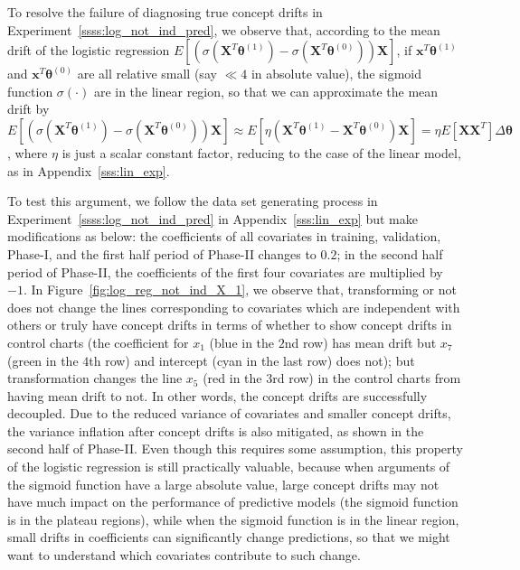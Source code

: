 \documentclass[twoside,11pt]{article}
\begin{document}
\begin{appendix}
\begin{enumerate}[(I)]
To resolve the failure of diagnosing true concept drifts in Experiment~\ref{ssss:log_not_ind_pred}, we observe that, according to the mean drift of the logistic regression $E [ (\sigma (\bm {X}^T\bm { \theta}^{ (1)}) - \sigma ( \bm {X}^T\bm { \theta}^{ (0)})) \bm {X}] $, if $ \bm {x}^T\bm { \theta}^{ (1)}$ and $ \bm {x}^T\bm { \theta}^{ (0)}$ are all relative small (say $\ll 4$ in absolute value), the sigmoid function $ \sigma (\cdot)$ are in the linear region, so that we can approximate the mean drift by $E [ (\sigma ( \bm {X}^T\bm { \theta}^{ (1)} ) - \sigma ( \bm {X}^T\bm { \theta}^{ (0)} )) \bm {X}] \approx E [ \eta( \bm {X}^T\bm { \theta}^{ (1)} -  \bm {X}^T\bm { \theta}^{ (0)} ) \bm {X}] = \eta E[\bm{XX}^T] \Delta \bm { \theta} $, where $ \eta$ is just a scalar constant factor, reducing to the case of the linear model, as in Appendix~\ref{sss:lin_exp}.  

To test this argument, we follow the data set generating process in Experiment~\ref{ssss:log_not_ind_pred} in Appendix~\ref{sss:lin_exp} but make modifications as below: the coefficients of all covariates in training, validation, Phase-I, and the first half period of Phase-II changes to $0.2$; in the second half period of Phase-II, the coefficients of the first four covariates are multiplied by $-1$. In Figure~\ref{fig:log_reg_not_ind_X_1}, we observe that, transforming or not does not change the lines corresponding to covariates which are independent with others or truly have concept drifts in terms of whether to show concept drifts in control charts (the coefficient for $x_1$ (blue in the $2$nd row) has mean drift but $x_7$ (green in the $4$th row) and intercept (cyan in the last row) does not); but transformation changes the line $x_5$ (red in the $3$rd row) in the control charts from having mean drift to not. In other words, the concept drifts are successfully decoupled. Due to the reduced variance of covariates and smaller concept drifts, the variance inflation after concept drifts is also mitigated, as shown in the second half of Phase-II. Even though this requires some assumption, this property of the logistic regression is still practically valuable, because when arguments of the sigmoid function have a large absolute value, large concept drifts may not have much impact on the performance of predictive models (the sigmoid function is in the plateau regions), while when the sigmoid function is in the linear region, small drifts in coefficients can significantly change predictions, so that we might want to understand which covariates contribute to such change.


\end{enumerate}
\end{appendix}
\end{document}
